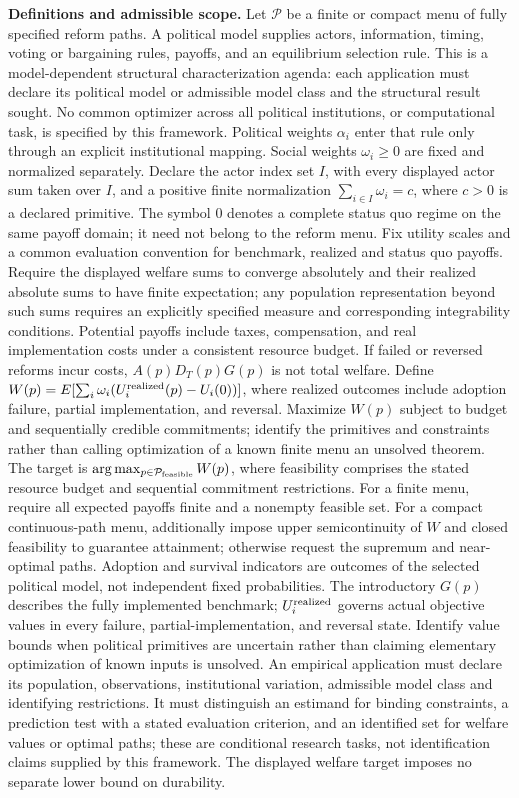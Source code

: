 \documentclass[11pt,a4paper]{article}
\begin{document}
\textbf{Definitions and admissible scope.} Let \(\mathcal P\) be a finite or compact menu of fully specified reform paths. A political model supplies actors, information, timing, voting or bargaining rules, payoffs, and an equilibrium selection rule. This is a model-dependent structural characterization agenda: each application must declare its political model or admissible model class and the structural result sought. No common optimizer across all political institutions, or computational task, is specified by this framework. Political weights \(\alpha_i\) enter that rule only through an explicit institutional mapping. Social weights \(\omega_i\ge0\) are fixed and normalized separately. Declare the actor index set \(I\), with every displayed actor sum taken over \(I\), and a positive finite normalization \(\sum_{i\in I}\omega_i=c\), where \(c>0\) is a declared primitive. The symbol \(0\) denotes a complete status quo regime on the same payoff domain; it need not belong to the reform menu. Fix utility scales and a common evaluation convention for benchmark, realized and status quo payoffs. Require the displayed welfare sums to converge absolutely and their realized absolute sums to have finite expectation; any population representation beyond such sums requires an explicitly specified measure and corresponding integrability conditions. Potential payoffs include taxes, compensation, and real implementation costs under a consistent resource budget. If failed or reversed reforms incur costs, \(A(p)D_T(p)G(p)\) is not total welfare. Define \(W(p)=E[\sum_i\omega_i(U_i^{\rm realized}(p)-U_i(0))]\), where realized outcomes include adoption failure, partial implementation, and reversal. Maximize \(W(p)\) subject to budget and sequentially credible commitments; identify the primitives and constraints rather than calling optimization of a known finite menu an unsolved theorem. The target is \(\arg\max_{p\in\mathcal P_{\rm feasible}}W(p)\), where feasibility comprises the stated resource budget and sequential commitment restrictions. For a finite menu, require all expected payoffs finite and a nonempty feasible set. For a compact continuous-path menu, additionally impose upper semicontinuity of \(W\) and closed feasibility to guarantee attainment; otherwise request the supremum and near-optimal paths. Adoption and survival indicators are outcomes of the selected political model, not independent fixed probabilities. The introductory \(G(p)\) describes the fully implemented benchmark; \(U_i^{\rm realized}\) governs actual objective values in every failure, partial-implementation, and reversal state. Identify value bounds when political primitives are uncertain rather than claiming elementary optimization of known inputs is unsolved. An empirical application must declare its population, observations, institutional variation, admissible model class and identifying restrictions. It must distinguish an estimand for binding constraints, a prediction test with a stated evaluation criterion, and an identified set for welfare values or optimal paths; these are conditional research tasks, not identification claims supplied by this framework. The displayed welfare target imposes no separate lower bound on durability.
\end{document}
